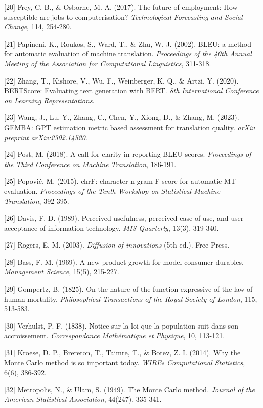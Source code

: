 \documentclass[12pt,a4paper]{article}
\begin{document}
{{{{{{[}20{]} Frey, C. B., \& Osborne, M. A. (2017). The future of
employment: How susceptible are jobs to computerisation?
\emph{Technological Forecasting and Social Change}, 114, 254-280.

{[}21{]} Papineni, K., Roukos, S., Ward, T., \& Zhu, W. J. (2002). BLEU:
a method for automatic evaluation of machine translation.
\emph{Proceedings of the 40th Annual Meeting of the Association for
Computational Linguistics}, 311-318.

{[}22{]} Zhang, T., Kishore, V., Wu, F., Weinberger, K. Q., \& Artzi, Y.
(2020). BERTScore: Evaluating text generation with BERT. \emph{8th
International Conference on Learning Representations}.

{[}23{]} Wang, J., Lu, Y., Zhang, C., Chen, Y., Xiong, D., \& Zhang, M.
(2023). GEMBA: GPT estimation metric based assessment for translation
quality. \emph{arXiv preprint arXiv:2302.14520}.

{[}24{]} Post, M. (2018). A call for clarity in reporting BLEU scores.
\emph{Proceedings of the Third Conference on Machine Translation},
186-191.

{[}25{]} Popović, M. (2015). chrF: character n-gram F-score for
automatic MT evaluation. \emph{Proceedings of the Tenth Workshop on
Statistical Machine Translation}, 392-395.

{[}26{]} Davis, F. D. (1989). Perceived usefulness, perceived ease of
use, and user acceptance of information technology. \emph{MIS
Quarterly}, 13(3), 319-340.

{[}27{]} Rogers, E. M. (2003). \emph{Diffusion of innovations} (5th
ed.). Free Press.

{[}28{]} Bass, F. M. (1969). A new product growth for model consumer
durables. \emph{Management Science}, 15(5), 215-227.

{[}29{]} Gompertz, B. (1825). On the nature of the function expressive
of the law of human mortality. \emph{Philosophical Transactions of the
Royal Society of London}, 115, 513-583.

{[}30{]} Verhulst, P. F. (1838). Notice sur la loi que la population
suit dans son accroissement. \emph{Correspondance Mathématique et
Physique}, 10, 113-121.

{[}31{]} Kroese, D. P., Brereton, T., Taimre, T., \& Botev, Z. I.
(2014). Why the Monte Carlo method is so important today. \emph{WIREs
Computational Statistics}, 6(6), 386-392.

{[}32{]} Metropolis, N., \& Ulam, S. (1949). The Monte Carlo method.
\emph{Journal of the American Statistical Association}, 44(247),
335-341.

}}}}}
\end{document}
